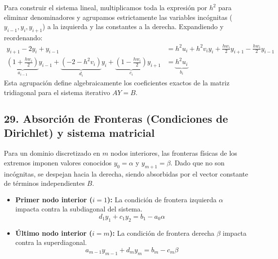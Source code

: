 \documentclass[12pt]{article}
\begin{document}
Para construir el sistema lineal, multiplicamos toda la expresión por $h^2$ para eliminar denominadores y agrupamos estrictamente las variables incógnitas ($y_{i-1}, y_i, y_{i+1}$) a la izquierda y las constantes a la derecha. Expandiendo y reordenando:
\begin{align*}
    y_{i+1} - 2y_i + y_{i-1} &= h^2 u_i + h^2 v_i y_i + \frac{h w_i}{2} y_{i+1} - \frac{h w_i}{2} y_{i-1} \\
    \underbrace{\left(1 + \frac{h w_i}{2}\right)}_{a_{i-1}} y_{i-1} + \underbrace{\left(-2 - h^2 v_i\right)}_{d_i} y_i + \underbrace{\left(1 - \frac{h w_i}{2}\right)}_{c_i} y_{i+1} &= \underbrace{h^2 u_i}_{b_i}
\end{align*}
Esta agrupación define algebraicamente los coeficientes exactos de la matriz tridiagonal para el sistema iterativo $AY = B$.

\subsection*{29. Absorción de Fronteras (Condiciones de Dirichlet) y sistema matricial}
Para un dominio discretizado en $m$ nodos interiores, las fronteras físicas de los extremos imponen valores conocidos $y_0 = \alpha$ y $y_{m+1} = \beta$. Dado que no son incógnitas, se despejan hacia la derecha, siendo absorbidas por el vector constante de términos independientes $B$.

\begin{itemize}
    \item \textbf{Primer nodo interior ($i=1$):} La condición de frontera izquierda $\alpha$ impacta contra la subdiagonal del sistema.
    \begin{equation}
        d_1 y_1 + c_1 y_2 = b_1 - a_0 \alpha
    \end{equation}
    \item \textbf{Último nodo interior ($i=m$):} La condición de frontera derecha $\beta$ impacta contra la superdiagonal.
    \begin{equation}
        a_{m-1} y_{m-1} + d_m y_m = b_m - c_m \beta
    \end{equation}
\end{itemize}
\end{document}
